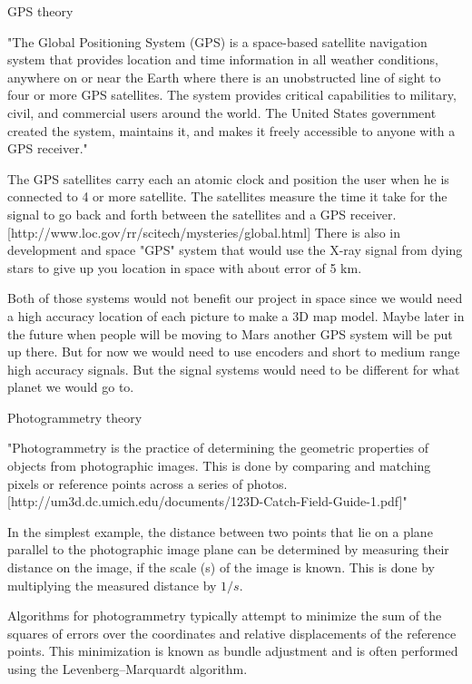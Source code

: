 GPS theory

"The Global Positioning System (GPS) is a space-based satellite navigation system that provides location and time information in all weather conditions, anywhere on or near the Earth where there is an unobstructed line of sight to four or more GPS satellites. The system provides critical capabilities to military, civil, and commercial users around the world. The United States government created the system, maintains it, and makes it freely accessible to anyone with a GPS receiver."%

The GPS satellites carry each an atomic clock and position the user when he is connected to 4 or more satellite. The satellites measure the time it take for the signal to go back and forth between the satellites and a GPS receiver.[http://www.loc.gov/rr/scitech/mysteries/global.html] There is also in development and space "GPS" system that would use the X-ray signal from dying stars to give up you location in space with about error of 5 km.%

Both of those systems would not benefit our project in space since we would need a high accuracy location of each picture to make a 3D map model. Maybe later in the future when people will be moving to Mars another GPS system will be put up there. But for now we would need to use encoders and short to medium range high accuracy signals. But the signal systems would need to be different for what planet we would go to. 

Photogrammetry theory

"Photogrammetry is the practice of determining the geometric properties of objects from
photographic images. This is done by comparing and matching pixels or reference points across a series
of photos.[http://um3d.dc.umich.edu/documents/123D-Catch-Field-Guide-1.pdf]"


In the simplest example, the distance between two points that lie on a plane parallel to the photographic image plane can be determined by measuring their distance on the image, if the scale (s) of the image is known. This is done by multiplying the measured distance by $1/s$.%

Algorithms for photogrammetry typically attempt to minimize the sum of the squares of errors over the coordinates and relative displacements of the reference points. This minimization is known as bundle adjustment and is often performed using the Levenberg–Marquardt algorithm.%

